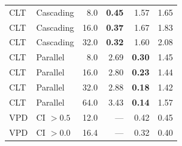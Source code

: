 \begin{table}[t]
\begin{tabular}{llrrrr}
    \midrule
    CLT & Cascading   &  8.0 & \textbf{0.45} & 1.57 & 1.65 \\
    CLT & Cascading   & 16.0 & \textbf{0.37} & 1.67 & 1.83 \\
    CLT & Cascading   & 32.0 & \textbf{0.32} & 1.60 & 2.08 \\
    \midrule
    CLT & Parallel    &  8.0 & 2.69 & \textbf{0.30} & 1.45 \\
    CLT & Parallel    & 16.0 & 2.80 & \textbf{0.23} & 1.44 \\
    CLT & Parallel    & 32.0 & 2.88 & \textbf{0.18} & 1.42 \\
    CLT & Parallel    & 64.0 & 3.43 & \textbf{0.14} & 1.57 \\
    \midrule
    VPD & CI $> 0.5$  & 12.0 & ---           & 0.42 & 0.45 \\
    VPD & CI $> 0.0$  & 16.4 & ---           & 0.32 & 0.40 \\
    \bottomrule
  \end{tabular}
\end{table}
